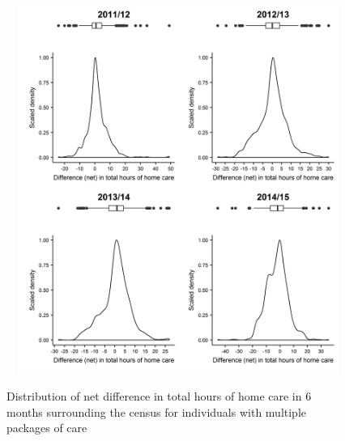 \documentclass[]{article}
\begin{document}
\begin{figure}[]
  \centering
    \caption{Distribution of net difference in total hours of home care in 6 months surrounding the census for individuals with multiple packages of care}
    \includegraphics[height = 12cm, width = 16cm]{figures/chapter-renf/16-census-multiples-netdiff.png}
    \label{fig:renf-multiple-cen-netdiff}
\end{figure}

\begin{table}[h]
\centering
\caption{Summary statistics of net difference in total hours of homecare in 6 months surrounding the census for individuals with multiple packages of care}
\label{tab:renf-multi-cen-netdiff}
\end{table}
\end{document}
